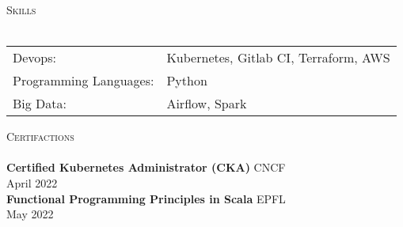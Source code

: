 \documentclass[a4paper]{article}
\newcommand{\lineunder} {
    \vspace*{-8pt} \\
    \hspace*{-18pt} \hrulefill \\
}
\newcommand{\header} [1] {
    {\hspace*{-18pt}\vspace*{6pt} \textsc{#1}}
    \vspace*{-6pt} \lineunder
}
\begin{document}
\header{Skills}
\begin{tabular}{ l l }
	Devops:                & Kubernetes, Gitlab CI, Terraform, AWS \\
	Programming Languages: & Python                                \\
	Big Data:              & Airflow, Spark                        \\
\end{tabular}
\vspace{2mm}



\header{Certifactions}
\textbf{Certified Kubernetes Administrator (CKA)} \hfill CNCF\\
\hfill April 2022\\
\vspace*{2mm}
\textbf{Functional Programming Principles in Scala} \hfill EPFL\\
\hfill May 2022\\
\vspace*{2mm}

\ 
\end{document}
